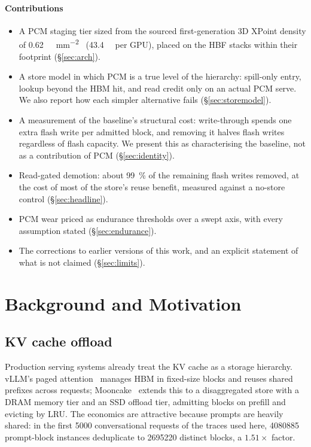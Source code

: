 \documentclass[conference]{IEEEtran}
\begin{document}
\paragraph{Contributions}
\begin{itemize}
  \item A PCM staging tier sized from the sourced first-generation 3D XPoint
        density of \SI{0.62}{\giga\bit\per\milli\meter\squared}~\cite{ehrmann2022pcm}
        (\SI{43.4}{\gibi\byte} per GPU), placed on the HBF stacks within their
        footprint (\S\ref{sec:arch}).
  \item A store model in which PCM is a true level of the hierarchy: spill-only
        entry, lookup beyond the HBM hit, and read credit only on an actual PCM
        serve. We also report how each simpler alternative fails
        (\S\ref{sec:storemodel}).
  \item A measurement of the baseline's structural cost: write-through spends
        one extra flash write per admitted block, and removing it halves flash
        writes regardless of flash capacity. We present this as characterising
        the baseline, not as a contribution of PCM (\S\ref{sec:identity}).
  \item Read-gated demotion: about \SI{99}{\percent} of the remaining flash
        writes removed, at the cost of most of the store's reuse benefit,
        measured against a no-store control (\S\ref{sec:headline}).
  \item PCM wear priced as endurance thresholds over a swept axis, with every
        assumption stated (\S\ref{sec:endurance}).
  \item The corrections to earlier versions of this work, and an explicit
        statement of what is not claimed (\S\ref{sec:limits}).
\end{itemize}

\section{Background and Motivation}

\subsection{KV cache offload}
Production serving systems already treat the KV cache as a storage hierarchy.
vLLM's paged attention~\cite{vllm} manages HBM in fixed-size blocks and reuses
shared prefixes across requests; Mooncake~\cite{mooncake} extends this to a
disaggregated store with a DRAM memory tier and an SSD offload tier, admitting
blocks on prefill and evicting by LRU. The economics are attractive because
prompts are heavily shared: in the first \num{5000} conversational requests of
the traces used here, \num{4080885} prompt-block instances deduplicate to
\num{2695220} distinct blocks, a $1.51\times$ factor.
\end{document}
